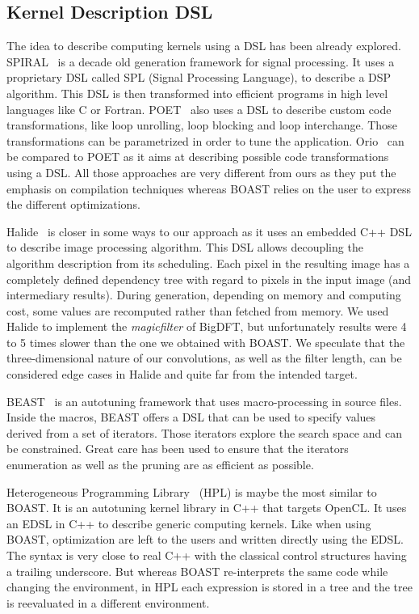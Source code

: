 \documentclass{IEEEtran}
\begin{document}
\subsection{Kernel Description DSL}

The idea to describe computing kernels using a DSL has been already explored.
SPIRAL~\cite{puschel2004spiral} is a decade old generation
framework for signal processing. It uses a proprietary DSL called SPL (Signal
Processing Language), to describe a DSP algorithm. This DSL is then transformed
into efficient programs in high level languages like C or Fortran.
POET~\cite{yi2007poet} also uses a DSL to describe custom code transformations,
like loop unrolling, loop blocking and loop interchange. Those transformations
can be parametrized in order to tune the application. Orio~\cite{Hart2009:Orio}
can be compared to POET as it aims at describing possible code transformations
using a DSL. All those approaches are very different from ours as they put the
emphasis on compilation techniques whereas BOAST relies on the user to express
the different optimizations.

  Halide~\cite{ragan2013halide} is closer in some ways to our approach as it
uses an embedded C++ DSL to describe image processing algorithm. This DSL allows
decoupling the algorithm description from its scheduling. Each pixel in the
resulting image has a completely defined dependency tree with regard to pixels
in the input image (and intermediary results). During generation, depending on
memory and computing cost, some values are recomputed rather than fetched from
memory. We used Halide to implement the \emph{magicfilter} of BigDFT, but
unfortunately results were 4 to 5 times slower than the one we obtained with
BOAST. We speculate that the three-dimensional nature of our convolutions, as
well as the filter length, can be considered edge cases in Halide and quite far
from the intended target.

BEAST~\cite{CPE:CPE3516} is an autotuning framework that uses macro-processing
in source files. Inside the macros, BEAST offers a DSL that can be used to
specify values derived from a set of iterators. Those iterators explore the
search space and can be constrained. Great care has been used to ensure that
the iterators enumeration as well as the pruning are as efficient as possible.

Heterogeneous Programming Library~\cite{vinas2013exploiting} (HPL) is maybe
the most similar to BOAST. It is an autotuning kernel library in C++ that targets
OpenCL. It uses an EDSL in C++ to describe generic computing kernels. Like when
using BOAST, optimization are left to the users and written directly using the
EDSL. The syntax is very close to real C++ with the classical control
structures having a trailing underscore. But whereas BOAST re-interprets the
same code while changing the environment, in HPL each expression is stored in a
tree and the tree is reevaluated in a different environment.
\end{document}

